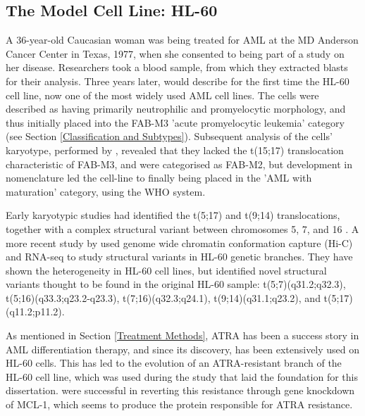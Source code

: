 \subsection{The Model Cell Line: HL-60 }
A 36-year-old Caucasian woman was being treated for \ac{AML} at the MD Anderson Cancer Center in Texas, 1977, when she consented to being part of a study on her disease. Researchers took a blood sample, from which they extracted blasts for their analysis. Three years later, \cite{gallagher1979characterization} would describe for the first time the HL-60 cell line, now one of the most widely used \ac{AML} cell lines. The cells were described as having primarily neutrophilic and promyelocytic morphology, and thus initially placed into the \ac{FAB}-M3 'acute promyelocytic leukemia' category (see Section \ref{Classification and Subtypes}). Subsequent analysis of the cells' karyotype, performed by \cite{dalton1988hl}, revealed that they lacked the t(15;17) translocation characteristic of \ac{FAB}-M3, and were categorised as \ac{FAB}-M2, but development in nomenclature led the cell-line to finally being placed in the 'AML with maturation' category, using the \ac{WHO} system.

Early karyotypic studies had identified the t(5;17) \citep{von1990double} and t(9;14) translocations, together with a complex structural variant between chromosomes 5, 7, and 16 \citep{liang1999spectral}. A more recent study by \cite{jacob} used genome wide chromatin conformation capture (Hi-C) and RNA-seq to study structural variants in HL-60 genetic branches. They have shown the heterogeneity in HL-60 cell lines, but identified novel structural variants thought to be found in the original HL-60 sample: t(5;7)(q31.2;q32.3), t(5;16)(q33.3;q23.2-q23.3), t(7;16)(q32.3;q24.1), t(9;14)(q31.1;q23.2), and t(5;17)(q11.2;p11.2).

As mentioned in Section \ref{Treatment Methods}, \ac{ATRA} has been a success story in \ac{AML} differentiation therapy, and since its discovery, has been extensively used on HL-60 cells. This has led to the evolution of an ATRA-resistant branch of the HL-60 cell line, which was used during the study \citep{Gatt2016} that laid the foundation for this dissertation. \cite{fu2005effects} were successful in reverting this resistance through gene knockdown of MCL-1, which seems to produce the protein responsible for \ac{ATRA} resistance.





